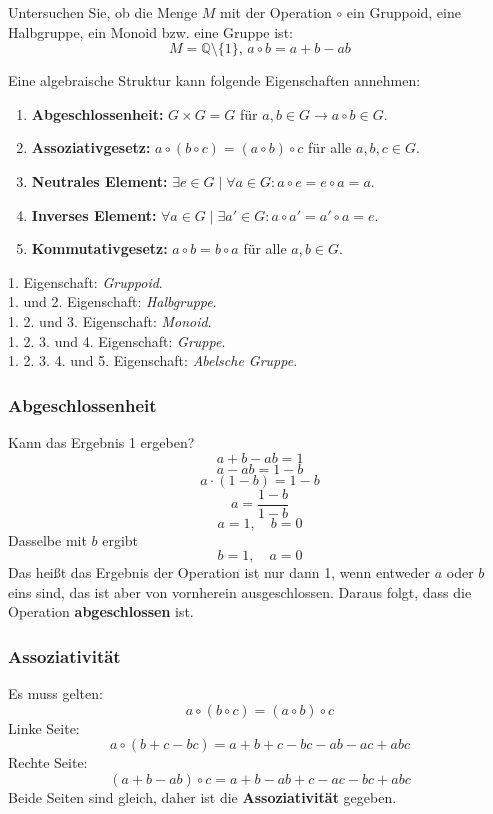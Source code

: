\documentclass[a4paper, 12pt, margins=3cm]{homework}
\newcommand{\Q}{\mathbb{Q}}
\begin{document}
  \begin{problem}
    Untersuchen Sie, ob die Menge $M$ mit der Operation $\circ$ ein Gruppoid,
    eine Halbgruppe, ein Monoid bzw. eine Gruppe ist:
    \[ M = \Q\setminus \{1\},\, a\circ b = a+b-ab \]
  \end{problem}
  \begin{solution}
    Eine algebraische Struktur kann folgende Eigenschaften annehmen:
    \begin{enumerate}
      \item \textbf{Abgeschlossenheit:} $G\times G = G$ für $a,b\in G \rightarrow a\circ b\in G$.
      \item \textbf{Assoziativgesetz:} $a\circ (b\circ c) = (a\circ b)\circ c$ für alle $a,b,c\in G$.
      \item \textbf{Neutrales Element:} $\exists e\in G\; |\; \forall a\in G: a\circ e = e\circ a = a$.
      \item \textbf{Inverses Element:} $\forall a\in G\; |\; \exists a'\in G: a\circ a' = a'\circ a = e$.
      \item \textbf{Kommutativgesetz:} $a\circ b = b\circ a$ für alle $a,b\in G$.
    \end{enumerate}
    1. Eigenschaft: \emph{Gruppoid}.\\
    1. und 2. Eigenschaft: \emph{Halbgruppe}.\\
    1. 2. und 3. Eigenschaft: \emph{Monoid}.\\
    1. 2. 3. und 4. Eigenschaft: \emph{Gruppe}.\\
    1. 2. 3. 4. und 5. Eigenschaft: \emph{Abelsche Gruppe}.

    \subsubsection*{Abgeschlossenheit}
      Kann das Ergebnis 1 ergeben?
      \[ a+b-ab = 1 \]
      \[ a-ab=1-b \]
      \[ a\cdot (1-b) = 1-b \]
      \[a = \frac{1-b}{1-b} \]
      \[ a=1,\quad b=0\]
      Dasselbe mit $b$ ergibt
      \[ b=1,\quad a=0 \]
      Das heißt das Ergebnis der Operation ist nur dann 1, wenn entweder $a$ oder $b$
      eins sind, das ist aber von vornherein ausgeschlossen. Daraus folgt, dass 
      die Operation \textbf{abgeschlossen} ist.

    \subsubsection*{Assoziativität}
      Es muss gelten:
        \[ a\circ (b\circ c) = (a\circ b)\circ c \]
      Linke Seite:
        \[ a\circ (b+c-bc) = a+b+c-bc-ab-ac+abc \]
      Rechte Seite:
        \[ (a+b-ab)\circ c = a+b-ab+c-ac-bc+abc \]
      Beide Seiten sind gleich, daher ist die \textbf{Assoziativität} gegeben.


\end{solution}
\end{document}
